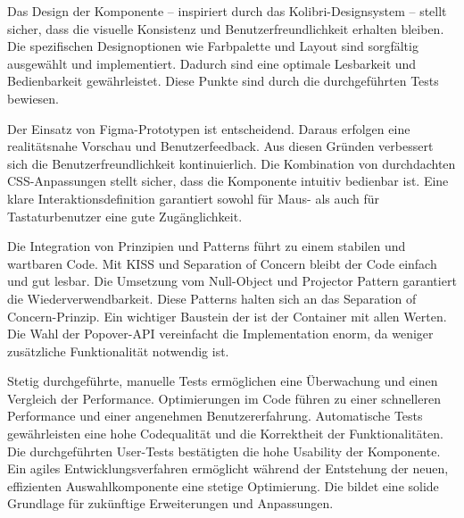 Das Design der Komponente – inspiriert durch das Kolibri-Designsystem – stellt sicher, dass die visuelle Konsistenz und Benutzerfreundlichkeit erhalten bleiben. 
Die spezifischen Designoptionen wie Farbpalette und Layout sind sorgfältig ausgewählt und implementiert. 
Dadurch sind eine optimale Lesbarkeit und Bedienbarkeit gewährleistet. 
Diese Punkte sind durch die durchgeführten Tests bewiesen. 

Der Einsatz von Figma-Prototypen ist entscheidend. 
Daraus erfolgen eine realitätsnahe Vorschau und Benutzerfeedback. 
Aus diesen Gründen verbessert sich die Benutzerfreundlichkeit kontinuierlich. 
Die Kombination von durchdachten CSS-Anpassungen stellt sicher, dass die Komponente intuitiv bedienbar ist. 
Eine klare Interaktionsdefinition garantiert sowohl für Maus- als auch für Tastaturbenutzer eine gute Zugänglichkeit. 

Die Integration von Prinzipien und Patterns führt zu einem stabilen und wartbaren Code. 
Mit KISS und Separation of Concern bleibt der Code einfach und gut lesbar. 
Die Umsetzung vom Null-Object und Projector Pattern garantiert die Wiederverwendbarkeit. 
Diese Patterns halten sich an das Separation of Concern-Prinzip. 
Ein wichtiger Baustein der  ist der Container mit allen Werten. 
Die Wahl der Popover-API vereinfacht die Implementation enorm, da weniger zusätzliche Funktionalität notwendig ist. 

Stetig durchgeführte, manuelle Tests ermöglichen eine Überwachung und einen Vergleich der Performance. 
Optimierungen im Code führen zu einer schnelleren Performance und einer angenehmen Benutzererfahrung. 
Automatische Tests gewährleisten eine hohe Codequalität und die Korrektheit der Funktionalitäten. 
Die durchgeführten User-Tests bestätigten die hohe Usability der Komponente. 
Ein agiles Entwicklungsverfahren ermöglicht während der Entstehung der neuen, effizienten Auswahlkomponente eine stetige Optimierung. 
Die  bildet eine solide Grundlage für zukünftige Erweiterungen und Anpassungen. 
